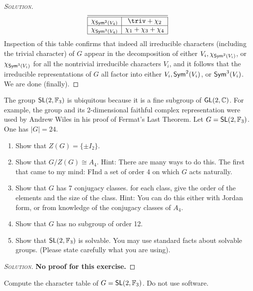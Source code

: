 \begin{proof}[{\scshape Solution}]
\[\begin{array}{|c|c|}
\hline
\hline \chi_{\Sym^2(V_4)}  & \triv + \chi_2 \\
\hline \chi_{\Sym^3(V_4)}  & \chi_1 + \chi_3 + \chi_4 \\
\hline
\end{array}
\]
Inspection of this table confirms that indeed all irreducible characters (including the trivial character) of $G$ appear in the decomposition of either $V_i, \chi_{\mathsf{Sym}^2(V_i)}$, or $\chi_{\mathsf{Sym}^3(V_i)}$ for all the nontrivial irreducible characters $V_i$, and it follows that the irreducible representations of $G$ all factor into either $V_i, \mathsf{Sym}^2(V_i)$, or $\mathsf{Sym}^3(V_i)$. We are done (finally).
\end{proof}

\newpage

\begin{problem}
The group $\mathsf{SL}(2, \mathbb{F}_3)$ is ubiquitous because it is a fine subgroup of $\mathsf{GL}(2,\mathbb{C})$. For example, the group and its 2-dimensional faithful complex representation were used by Andrew Wiles in his proof of Fermat's Last Theorem.
Let $G = \mathsf{SL}(2, \mathbb{F}_3)$. One has $\lvert G \rvert = 24$.
\begin{enumerate}[font=\normalfont,label=\textbf{(\Alph*)}]


  \item Show that $Z(G) = \{\pm I_2\}$.
  \item Show that $G/Z(G) \cong A_4$. Hint: There are many ways to do this. The first that came to my mind: FInd a set of order 4 on which $G$ acts naturally.
  \item Show that $G$ has 7 conjugacy classes. for each class, give the order of the elements and the size of the class. Hint: You can do this either with Jordan form, or from knowledge of the conjugacy classes of $A_4$.
  \item Show that $G$ has no subgroup of order 12.
  \item Show that $\mathsf{SL}(2, \mathbb{F}_3)$ is solvable. You may use standard facts about solvable groups. (Please state carefully what you are using).
\end{enumerate}
\end{problem}

\begin{proof}[{\scshape Solution}]
\textbf{No proof for this exercise.}
\end{proof}

\newpage

\begin{problem}
Compute the character table of $G = \mathsf{SL}(2, \mathbb{F}_3)$. Do not use software.
\end{problem}

